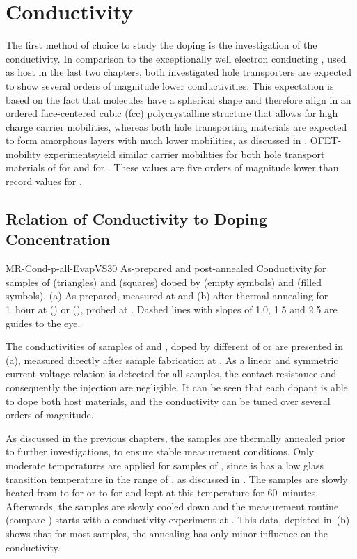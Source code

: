 \section{Conductivity}\label{sec:ResP-Cond}
The first method of choice to study the doping is the investigation of the conductivity.
%
In comparison to the exceptionally well electron conducting \CS, used as host in the last two chapters, both investigated hole transporters are expected to show several orders of magnitude lower conductivities. This expectation is based on the fact that \CS molecules have a spherical shape and therefore align in an ordered face-centered cubic (fcc) polycrystalline structure\cite{Peimo1993} that allows for high charge carrier mobilities, whereas both hole transporting materials are expected to form amorphous layers with much lower mobilities, as discussed in .
OFET-mobility experiments\mphOFET yield similar carrier mobilities for both hole transport materials of \mob[2.3E-05] for \meo and \mob[5.7E-05] for \lili. These values are five orders of magnitude lower than record values for \CS\cite{Itaka2006}.

\subsection{Relation of Conductivity to Doping Concentration}%
\label{sec:ResP-CondMR}

\cBild
{MR-Cond-p-all-EvapVS30}
{As-prepared and post-annealed \cLong}
{Conductivity \c \vs \CLongL for samples of \meo (triangles) and \lili (squares) doped by \FS (empty symbols) and \CSF (filled symbols). (a) As-prepared, measured at \T[25]
and (b) after thermal annealing for 1~hour at \T[45] (\meo) or  (\lili), probed at \T[30].
Dashed lines with slopes of 1.0, 1.5 and 2.5 are guides to the eye.
}

The conductivities of samples of \meo and \lili, doped by different \CLongs of \FS or \CSF are presented in \,(a), measured directly after sample fabrication at \T[25].
As a linear and symmetric current-voltage relation is detected for all samples, the contact resistance and consequently the injection are negligible. %
It can be seen that each dopant is able to dope both host materials, and the conductivity can be tuned over several orders of magnitude.

As discussed in the previous chapters, the samples are thermally annealed prior to further investigations, to ensure stable measurement conditions.
Only moderate temperatures are applied for samples of \meo, since is has a low glass transition temperature in the range of \Tg[67], as discussed in .
The samples are slowly heated from \T[25] to  for \meo or to  for \lili and kept at this temperature for 60~minutes. Afterwards, the samples are slowly cooled down and the measurement routine (compare ) starts with a conductivity experiment at \T[30]. This data, depicted in \,(b) shows that for most samples, the annealing has only minor influence on the conductivity.

